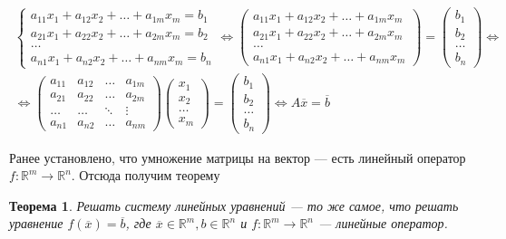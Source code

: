 \documentclass[]{article}
\newtheorem{theorem}{Теорема}
\begin{document}
\begin{gather*}
	\begin{cases}
		a_{11}x_1 + a_{12}x_2 + \ldots + a_{1m}x_m=b_1
		\\
		a_{21}x_1 + a_{22}x_2 + \ldots + a_{2m}x_m=b_2
		\\
		\ldots
		\\
		a_{n1}x_1 + a_{n2}x_2 + \ldots + a_{nm}x_m=b_n
	\end{cases}
	\Leftrightarrow
	\begin{pmatrix}
	a_{11}x_1 + a_{12}x_2 + \ldots + a_{1m}x_m
	\\
	a_{21}x_1 + a_{22}x_2 + \ldots + a_{2m}x_m
	\\
	\ldots
	\\
	a_{n1}x_1 + a_{n2}x_2 + \ldots + a_{nm}x_m
\end{pmatrix}
=
	\begin{pmatrix}
	b_1
	\\
	b_2
	\\
	\ldots
	\\
	b_n
\end{pmatrix}
\Leftrightarrow
\\
\Leftrightarrow
	\begin{pmatrix}
	a_{11} & a_{12} & \ldots & a_{1m}
	\\
	a_{21} & a_{22} & \ldots & a_{2m}
	\\
	\ldots & \ldots & \ddots & \vdots
	\\
	a_{n1} & a_{n2} & \ldots & a_{nm}
\end{pmatrix}
\begin{pmatrix}
	x_{1}
	\\
	x_{2}
	\\
	\ldots
	\\
	x_{m}
\end{pmatrix}
=
\begin{pmatrix}
	b_1
	\\
	b_2
	\\
	\ldots
	\\
	b_n
\end{pmatrix}
\Leftrightarrow
A\overline{x}=\overline{b}
\end{gather*}

Ранее установлено, что умножение матрицы на вектор --- есть линейный оператор $f:\mathbb{R}^m\rightarrow\mathbb{R}^n$. Отсюда получим теорему

\begin{theorem}
Решать систему линейных уравнений --- то же самое, что решать уравнение $f(\overline{x})=\overline{b}$, где $\overline{x}\in \mathbb{R}^m,b\in\mathbb{R}^n$ и $f:\mathbb{R}^m\rightarrow\mathbb{R}^n$ --- линейные оператор.
\end{theorem}
\end{document}
